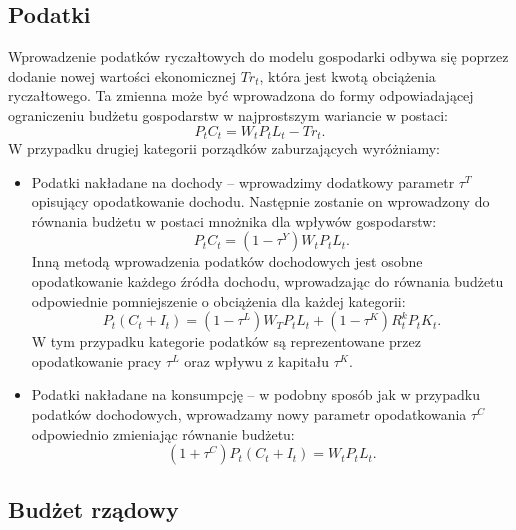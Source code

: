 \subsection{Podatki}

Wprowadzenie podatków ryczałtowych do modelu gospodarki odbywa się poprzez dodanie nowej wartości ekonomicznej $Tr_t$, która jest kwotą obciążenia ryczałtowego. Ta zmienna może być wprowadzona do formy odpowiadającej ograniczeniu budżetu gospodarstw w najprostszym wariancie w postaci:
\begin{equation}
    P_t C_t = W_t P_t L_t - Tr_t.
\end{equation}
W przypadku drugiej kategorii porządków zaburzających wyróżniamy:
\begin{itemize}
    \item Podatki nakładane na dochody -- wprowadzimy dodatkowy parametr $\tau^T$ opisujący opodatkowanie dochodu. Następnie zostanie on wprowadzony do równania budżetu w postaci mnożnika dla wpływów gospodarstw:
    \begin{equation}
        P_t C_t = (1-\tau^Y)W_t P_t L_t.
    \end{equation}
    Inną metodą wprowadzenia podatków dochodowych jest osobne opodatkowanie każdego źródła dochodu, wprowadzając do równania budżetu odpowiednie pomniejszenie o obciążenia dla każdej kategorii:
    \begin{equation}
        P_t\left(C_t + I_t\right) = (1-\tau^L)W_T P_t L_t + (1 - \tau^K)R^k_t P_t K_t.
    \end{equation}
    W tym przypadku kategorie podatków są reprezentowane przez opodatkowanie pracy $\tau^L$ oraz wpływu z kapitału $\tau^K$.
    \item Podatki nakładane na konsumpcję -- w podobny sposób jak w przypadku podatków dochodowych, wprowadzamy nowy parametr opodatkowania $\tau^C$ odpowiednio zmieniając równanie budżetu:
    \begin{equation}
        (1+\tau^C)P_t\left(C_t + I_t\right) = W_t P_t L_t.
    \end{equation}
\end{itemize}

\subsection{Budżet rządowy}

